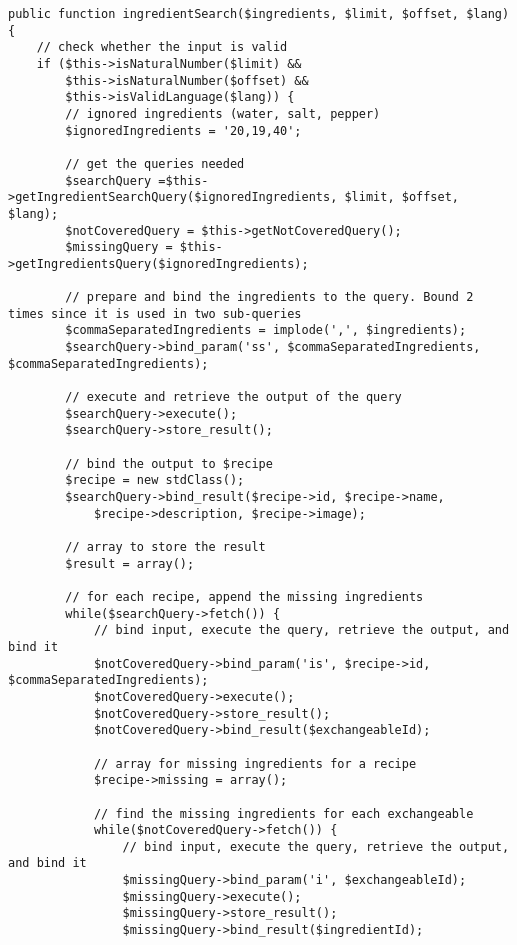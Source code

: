 \begin{lstlisting}[language=phpstyle, caption={Search by ingredients}]
public function ingredientSearch($ingredients, $limit, $offset, $lang) {
    // check whether the input is valid
    if ($this->isNaturalNumber($limit) &&
    	$this->isNaturalNumber($offset) &&
    	$this->isValidLanguage($lang)) {
        // ignored ingredients (water, salt, pepper)
        $ignoredIngredients = '20,19,40';

        // get the queries needed
        $searchQuery =$this->getIngredientSearchQuery($ignoredIngredients, $limit, $offset, $lang);
        $notCoveredQuery = $this->getNotCoveredQuery();
        $missingQuery = $this->getIngredientsQuery($ignoredIngredients);

        // prepare and bind the ingredients to the query. Bound 2 times since it is used in two sub-queries
        $commaSeparatedIngredients = implode(',', $ingredients);
        $searchQuery->bind_param('ss', $commaSeparatedIngredients, $commaSeparatedIngredients);
        
        // execute and retrieve the output of the query
        $searchQuery->execute();
        $searchQuery->store_result();

        // bind the output to $recipe
        $recipe = new stdClass();
        $searchQuery->bind_result($recipe->id, $recipe->name,
            $recipe->description, $recipe->image);

        // array to store the result
        $result = array();

        // for each recipe, append the missing ingredients 
        while($searchQuery->fetch()) {
        	// bind input, execute the query, retrieve the output, and bind it
            $notCoveredQuery->bind_param('is', $recipe->id, $commaSeparatedIngredients);
            $notCoveredQuery->execute();
            $notCoveredQuery->store_result();
            $notCoveredQuery->bind_result($exchangeableId);

            // array for missing ingredients for a recipe
        	$recipe->missing = array();

        	// find the missing ingredients for each exchangeable
        	while($notCoveredQuery->fetch()) {
                // bind input, execute the query, retrieve the output, and bind it
                $missingQuery->bind_param('i', $exchangeableId);
                $missingQuery->execute();
                $missingQuery->store_result();
                $missingQuery->bind_result($ingredientId);


\end{lstlisting}
